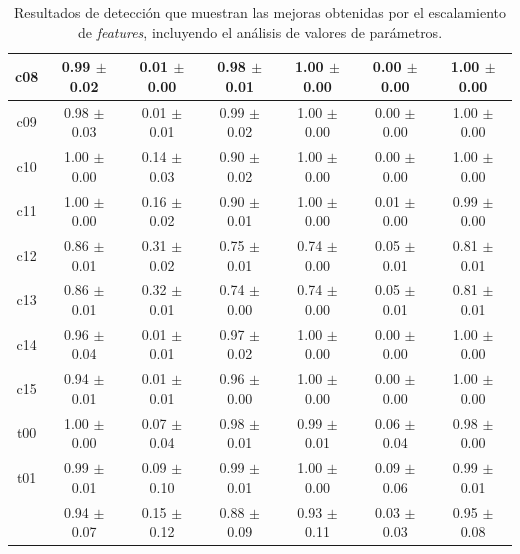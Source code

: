 \begin{table}[ht]
\begin{tabularx}{\linewidth}{|c|CCC|CCC|}
        c08 & \num{0.99} $\pm$ \num{0.02} & \num{0.01} $\pm$ \num{0.00} & \num{0.98} $\pm$ \num{0.01} & \num{1.00} $\pm$ \num{0.00} & \num{0.00} $\pm$ \num{0.00} & \num{1.00} $\pm$ \num{0.00} \\ \hline
        c09 & \num{0.98} $\pm$ \num{0.03} & \num{0.01} $\pm$ \num{0.01} & \num{0.99} $\pm$ \num{0.02} & \num{1.00} $\pm$ \num{0.00} & \num{0.00} $\pm$ \num{0.00} & \num{1.00} $\pm$ \num{0.00} \\ \hline
        c10 & \num{1.00} $\pm$ \num{0.00} & \num{0.14} $\pm$ \num{0.03} & \num{0.90} $\pm$ \num{0.02} & \num{1.00} $\pm$ \num{0.00} & \num{0.00} $\pm$ \num{0.00} & \num{1.00} $\pm$ \num{0.00} \\ \hline
        c11 & \num{1.00} $\pm$ \num{0.00} & \num{0.16} $\pm$ \num{0.02} & \num{0.90} $\pm$ \num{0.01} & \num{1.00} $\pm$ \num{0.00} & \num{0.01} $\pm$ \num{0.00} & \num{0.99} $\pm$ \num{0.00} \\ \hline
        c12 & \num{0.86} $\pm$ \num{0.01} & \num{0.31} $\pm$ \num{0.02} & \num{0.75} $\pm$ \num{0.01} & \num{0.74} $\pm$ \num{0.00} & \num{0.05} $\pm$ \num{0.01} & \num{0.81} $\pm$ \num{0.01} \\ \hline
        c13 & \num{0.86} $\pm$ \num{0.01} & \num{0.32} $\pm$ \num{0.01} & \num{0.74} $\pm$ \num{0.00} & \num{0.74} $\pm$ \num{0.00} & \num{0.05} $\pm$ \num{0.01} & \num{0.81} $\pm$ \num{0.01} \\ \hline
        c14 & \num{0.96} $\pm$ \num{0.04} & \num{0.01} $\pm$ \num{0.01} & \num{0.97} $\pm$ \num{0.02} & \num{1.00} $\pm$ \num{0.00} & \num{0.00} $\pm$ \num{0.00} & \num{1.00} $\pm$ \num{0.00} \\ \hline
        c15 & \num{0.94} $\pm$ \num{0.01} & \num{0.01} $\pm$ \num{0.01} & \num{0.96} $\pm$ \num{0.00} & \num{1.00} $\pm$ \num{0.00} & \num{0.00} $\pm$ \num{0.00} & \num{1.00} $\pm$ \num{0.00} \\ \hline
        t00 & \num{1.00} $\pm$ \num{0.00} & \num{0.07} $\pm$ \num{0.04} & \num{0.98} $\pm$ \num{0.01} & \num{0.99} $\pm$ \num{0.01} & \num{0.06} $\pm$ \num{0.04} & \num{0.98} $\pm$ \num{0.00} \\ \hline
        t01 & \num{0.99} $\pm$ \num{0.01} & \num{0.09} $\pm$ \num{0.10} & \num{0.99} $\pm$ \num{0.01} & \num{1.00} $\pm$ \num{0.00} & \num{0.09} $\pm$ \num{0.06} & \num{0.99} $\pm$ \num{0.01} \\
            & \num{0.94} $\pm$ \num{0.07} & \num{0.15} $\pm$ \num{0.12} & \num{0.88} $\pm$ \num{0.09} & \num{0.93} $\pm$ \num{0.11} & \num{0.03} $\pm$ \num{0.03} & \num{0.95} $\pm$ \num{0.08} \\ \hline
    \end{tabularx}

    \caption{Resultados de detección que muestran las mejoras obtenidas
        por el escalamiento de \textit{features}, incluyendo el análisis
        de valores de parámetros.}
    \label{tbl:res:results_scaling}
\end{table}

